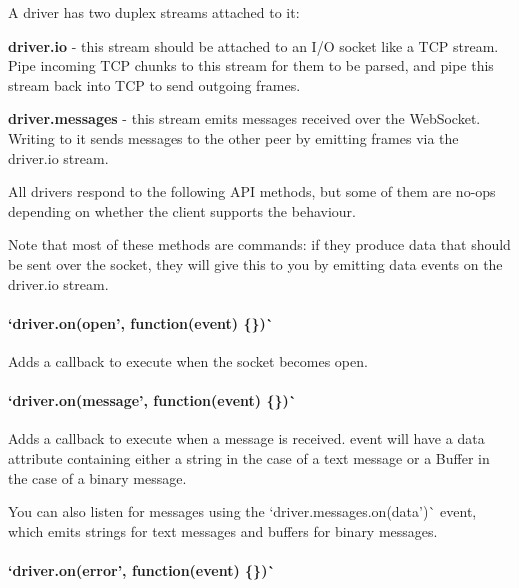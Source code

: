 A driver has two duplex streams attached to it\+:


\begin{DoxyItemize}
\item {\bfseries {\ttfamily driver.\+io}} -\/ this stream should be attached to an I/O socket like a T\+CP stream. Pipe incoming T\+CP chunks to this stream for them to be parsed, and pipe this stream back into T\+CP to send outgoing frames.
\item {\bfseries {\ttfamily driver.\+messages}} -\/ this stream emits messages received over the Web\+Socket. Writing to it sends messages to the other peer by emitting frames via the {\ttfamily driver.\+io} stream.
\end{DoxyItemize}

All drivers respond to the following A\+PI methods, but some of them are no-\/ops depending on whether the client supports the behaviour.

Note that most of these methods are commands\+: if they produce data that should be sent over the socket, they will give this to you by emitting {\ttfamily data} events on the {\ttfamily driver.\+io} stream.

\paragraph*{`driver.\+on(\textquotesingle{}open', function(event) \{\})\`{}}

Adds a callback to execute when the socket becomes open.

\paragraph*{`driver.\+on(\textquotesingle{}message', function(event) \{\})\`{}}

Adds a callback to execute when a message is received. {\ttfamily event} will have a {\ttfamily data} attribute containing either a string in the case of a text message or a {\ttfamily Buffer} in the case of a binary message.

You can also listen for messages using the `driver.\+messages.\+on(\textquotesingle{}data')\`{} event, which emits strings for text messages and buffers for binary messages.

\paragraph*{`driver.\+on(\textquotesingle{}error', function(event) \{\})\`{}}

